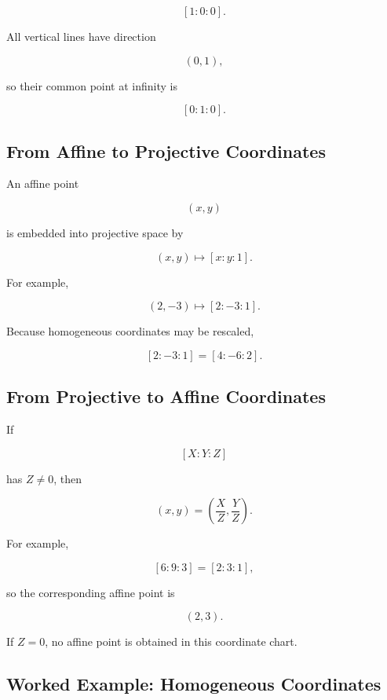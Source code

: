 \[
\boxed{[1:0:0].}
\]

All vertical lines have direction

\[
(0,1),
\]

so their common point at infinity is

\[
\boxed{[0:1:0].}
\]

\subsection{From Affine to Projective Coordinates}
\label{subsec:affine-to-projective}

An affine point

\[
(x,y)
\]

is embedded into projective space by

\[
\boxed{
(x,y)\longmapsto[x:y:1].
}
\]

For example,

\[
(2,-3)
\longmapsto
[2:-3:1].
\]

Because homogeneous coordinates may be rescaled,

\[
[2:-3:1]
=
[4:-6:2].
\]

\subsection{From Projective to Affine Coordinates}
\label{subsec:projective-to-affine}

If

\[
[X:Y:Z]
\]

has \(Z\neq0\), then

\[
\boxed{
(x,y)=
\left(
\frac{X}{Z},
\frac{Y}{Z}
\right).
}
\]

For example,

\[
[6:9:3]
=
[2:3:1],
\]

so the corresponding affine point is

\[
\boxed{(2,3).}
\]

If \(Z=0\), no affine point is obtained in this coordinate chart.

\subsection{Worked Example: Homogeneous Coordinates}
\label{subsec:worked-projective-homogeneous}

